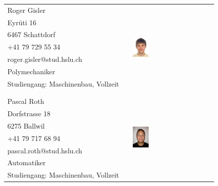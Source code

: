 \begin{tabular}{lp{3.3cm}l}
    Roger Gisler                                & & 
	\multirow{8}{4cm}{\includegraphics[width=0.2\textwidth]{DasTeam/Bilder/RogerGisler.jpg}} \\
    Eyrüti 16			                        & &  \\
    6467 Schattdorf                             & &  \\
    +41 79 729 55 34                            & &  \\
    roger.gisler@stud.hslu.ch                   & &  \\
    Polymechaniker                              & &  \\
    Studiengang: Maschinenbau, Vollzeit         & &  \\
                                                & &  \\
    				                            & &  \\
    Pascal Roth 								& & \multirow{8}{4cm}{\includegraphics[width=0.2\textwidth]{DasTeam/Bilder/PascalRoth.jpg}} \\
    Dorfstrasse 18                              & &  \\
    6275 Ballwil                                & &  \\
    +41 79 717 68 94                            & &  \\
    pascal.roth@stud.hslu.ch                    & &  \\
    Automatiker                                 & &  \\
    Studiengang: Maschinenbau, Vollzeit         & &  \\
  \end{tabular}